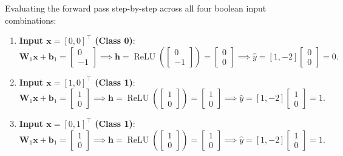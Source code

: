 Evaluating the forward pass step-by-step across all four boolean input combinations:
\begin{enumerate}[noitemsep,topsep=2pt,parsep=0pt,partopsep=0pt]
  \item \textbf{Input $\mathbf{x} = [0, 0]^\top$ (Class 0)}:
    \begin{equation}
    \mathbf{W}_1 \mathbf{x} + \mathbf{b}_1 = \begin{bmatrix} 0 \\ -1 \end{bmatrix} \implies \mathbf{h} = \operatorname{ReLU}\left(\begin{bmatrix} 0 \\ -1 \end{bmatrix}\right) = \begin{bmatrix} 0 \\ 0 \end{bmatrix} \implies \hat{y} = [1, -2] \begin{bmatrix} 0 \\ 0 \end{bmatrix} = 0.
    \end{equation}
  \item \textbf{Input $\mathbf{x} = [1, 0]^\top$ (Class 1)}:
    \begin{equation}
    \mathbf{W}_1 \mathbf{x} + \mathbf{b}_1 = \begin{bmatrix} 1 \\ 0 \end{bmatrix} \implies \mathbf{h} = \operatorname{ReLU}\left(\begin{bmatrix} 1 \\ 0 \end{bmatrix}\right) = \begin{bmatrix} 1 \\ 0 \end{bmatrix} \implies \hat{y} = [1, -2] \begin{bmatrix} 1 \\ 0 \end{bmatrix} = 1.
    \end{equation}
  \item \textbf{Input $\mathbf{x} = [0, 1]^\top$ (Class 1)}:
    \begin{equation}
    \mathbf{W}_1 \mathbf{x} + \mathbf{b}_1 = \begin{bmatrix} 1 \\ 0 \end{bmatrix} \implies \mathbf{h} = \operatorname{ReLU}\left(\begin{bmatrix} 1 \\ 0 \end{bmatrix}\right) = \begin{bmatrix} 1 \\ 0 \end{bmatrix} \implies \hat{y} = [1, -2] \begin{bmatrix} 1 \\ 0 \end{bmatrix} = 1.

\end{equation}
\end{enumerate}
